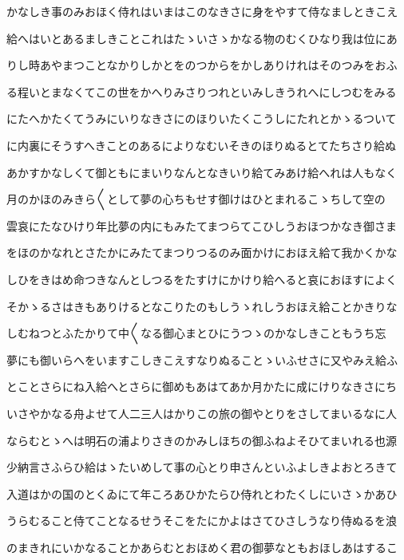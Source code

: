 \documentclass[a4paper,11pt,landscape]{ltjtarticle}
\begin{document}
\par\medskip
かなしき事のみおほく侍れはいまはこのなきさに身をやすて侍なましときこえ
\par\medskip
給へはいとあるましきことこれはたゝいさゝかなる物のむくひなり我は位にあ
\par\medskip
りし時あやまつことなかりしかとをのつからをかしありけれはそのつみをおふ
\par\medskip
る程いとまなくてこの世をかへりみさりつれといみしきうれへにしつむをみる
\par\medskip
にたへかたくてうみにいりなきさにのほりいたくこうしにたれとかゝるついて
\par\medskip
に内裏にそうすへきことのあるによりなむいそきのほりぬるとてたちさり給ぬ
\par\medskip
あかすかなしくて御ともにまいりなんとなきいり給てみあけ給へれは人もなく
\par\medskip
月のかほのみきら〱として夢の心ちもせす御けはひとまれるこゝちして空の
\par\medskip
雲哀にたなひけり年比夢の内にもみたてまつらてこひしうおほつかなき御さま
\par\medskip
をほのかなれとさたかにみたてまつりつるのみ面かけにおほえ給て我かくかな
\par\medskip
しひをきはめ命つきなんとしつるをたすけにかけり給へると哀におほすによく
\par\medskip
そかゝるさはきもありけるとなこりたのもしうゝれしうおほえ給ことかきりな
\par\medskip
しむねつとふたかりて中〱なる御心まとひにうつゝのかなしきこともうち忘
\par\medskip
夢にも御いらへをいますこしきこえすなりぬることゝいふせさに又やみえ給ふ
\par\medskip
とことさらにね入給へとさらに御めもあはてあか月かたに成にけりなきさにち
\par\medskip
いさやかなる舟よせて人二三人はかりこの旅の御やとりをさしてまいるなに人
\par\medskip
ならむとゝへは明石の浦よりさきのかみしほちの御ふねよそひてまいれる也源
\par\medskip
少納言さふらひ給はゝたいめして事の心とり申さんといふよしきよおとろきて
\par\medskip
入道はかの国のとくゐにて年ころあひかたらひ侍れとわたくしにいさゝかあひ
\par\medskip
うらむること侍てことなるせうそこをたにかよはさてひさしうなり侍ぬるを浪
\par\medskip
のまきれにいかなることかあらむとおほめく君の御夢なともおほしあはするこ
\end{document}
